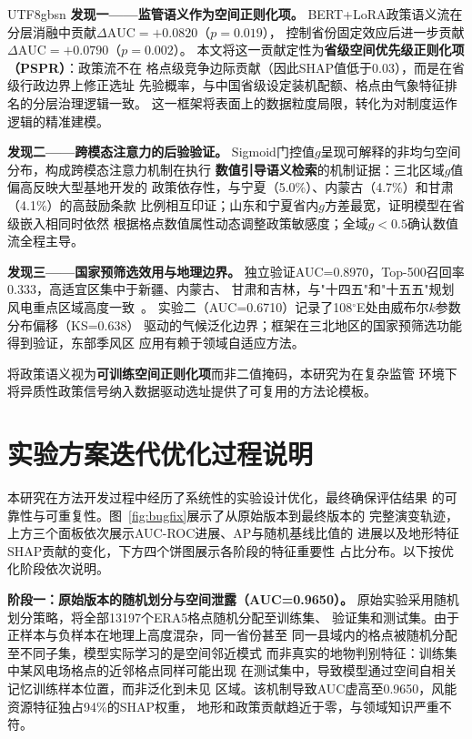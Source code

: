 \documentclass[12pt, a4paper]{article}
\begin{document}
\begin{CJK}{UTF8}{gbsn}
\textbf{发现一——监管语义作为空间正则化项。}
BERT+LoRA政策语义流在分层消融中贡献$\Delta\text{AUC}=+0.0820$（$p=0.019$），
控制省份固定效应后进一步贡献$\Delta\text{AUC}=+0.0790$（$p=0.002$）。
本文将这一贡献定性为\textbf{省级空间优先级正则化项（PSPR）}：政策流不在
格点级竞争边际贡献（因此SHAP值低于0.03），而是在省级行政边界上修正选址
先验概率，与中国省级设定装机配额、格点由气象特征排名的分层治理逻辑一致。
这一框架将表面上的数据粒度局限，转化为对制度运作逻辑的精准建模。

\textbf{发现二——跨模态注意力的后验验证。}
Sigmoid门控值$g$呈现可解释的非均匀空间分布，构成跨模态注意力机制在执行
\textbf{数值引导语义检索}的机制证据：三北区域$g$值偏高反映大型基地开发的
政策依存性，与宁夏（5.0\%）、内蒙古（4.7\%）和甘肃（4.1\%）的高鼓励条款
比例相互印证；山东和宁夏省内$g$方差最宽，证明模型在省级嵌入相同时依然
根据格点数值属性动态调整政策敏感度；全域$g<0.5$确认数值流全程主导。

\textbf{发现三——国家预筛选效用与地理边界。}
独立验证AUC=0.8970，Top-500召回率0.333，高适宜区集中于新疆、内蒙古、
甘肃和吉林，与"十四五"和"十五五"规划风电重点区域高度一致~\cite{ndrc2022,ndrc2026,he2023,zhong2022}。
实验二（AUC=0.6710）记录了108$^\circ$E处由威布尔$k$参数分布偏移（KS=0.638）
驱动的气候泛化边界；框架在三北地区的国家预筛选功能得到验证，东部季风区
应用有赖于领域自适应方法。

将政策语义视为\textbf{可训练空间正则化项}而非二值掩码，本研究为在复杂监管
环境下将异质性政策信号纳入数据驱动选址提供了可复用的方法论模板。


\appendix
\renewcommand{\thefigure}{A\arabic{figure}}
\setcounter{figure}{0}
\section{实验方案迭代优化过程说明}
\label{sec:appendix}

本研究在方法开发过程中经历了系统性的实验设计优化，最终确保评估结果
的可靠性与可重复性。图~\ref{fig:bugfix}展示了从原始版本到最终版本的
完整演变轨迹，上方三个面板依次展示AUC-ROC进展、AP与随机基线比值的
进展以及地形特征SHAP贡献的变化，下方四个饼图展示各阶段的特征重要性
占比分布。以下按优化阶段依次说明。

\textbf{阶段一：原始版本的随机划分与空间泄露（AUC=0.9650）。}
原始实验采用随机划分策略，将全部13197个ERA5格点随机分配至训练集、
验证集和测试集。由于正样本与负样本在地理上高度混杂，同一省份甚至
同一县域内的格点被随机分配至不同子集，模型实际学习的是空间邻近模式
而非真实的地物判别特征：训练集中某风电场格点的近邻格点同样可能出现
在测试集中，导致模型通过空间自相关记忆训练样本位置，而非泛化到未见
区域。该机制导致AUC虚高至0.9650，风能资源特征独占94\%的SHAP权重，
地形和政策贡献趋近于零，与领域知识严重不符。


\end{CJK}
\end{document}
